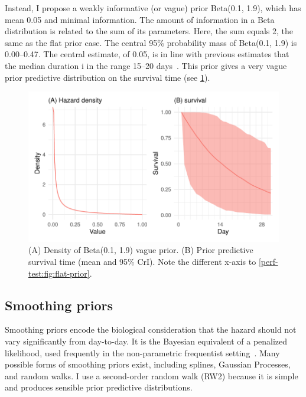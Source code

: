 \documentclass[thesis.tex]{subfiles}
\begin{document}
Instead, I propose a weakly informative (or vague) prior Beta(0.1, 1.9), which has mean 0.05 and minimal information.
The amount of information in a Beta distribution is related to the sum of its parameters.
Here, the sum equals 2, the same as the flat prior case.
The central 95\% probability mass of Beta(0.1, 1.9) is 0.00--0.47.
The central estimate, of 0.05, is in line with previous estimates that the median duration i in the range 15--20 days~\autocite{cevikShedding}.
This prior gives a very vague prior predictive distribution on the survival time (see \cref{perf-test:fig:vague-prior}).
\begin{figure}
  \centering \includegraphics{cis-perfect-testing/vague-prior}
  \caption[Vague prior for the hazard]{
    (A) Density of Beta(0.1, 1.9) vague prior.
    (B) Prior predictive survival time (mean and 95\% CrI).
    Note the different x-axis to \cref{perf-test:fig:flat-prior}.
  }
  \label{perf-test:fig:vague-prior}
\end{figure}


\subsection{Smoothing priors}

Smoothing priors encode the biological consideration that the hazard should not vary significantly from day-to-day.
It is the Bayesian equivalent of a penalized likelihood, used frequently in the non-parametric frequentist setting~\autocite[e.g.][]{bacchettiNonparametric}.
Many possible forms of smoothing priors exist, including splines, Gaussian Processes, and random walks.
I use a second-order random walk (RW2) because it is simple and produces sensible prior predictive distributions.
\end{document}
